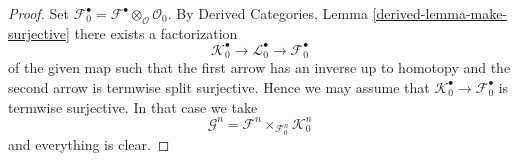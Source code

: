 \documentclass[10pt,a4paper]{amsart}
\theoremstyle{plain}
\theoremstyle{definition}
\theoremstyle{remark}
\numberwithin{equation}{subsection}
\begin{document}
\begin{proof}
Set $\mathcal{F}_0^\bullet =
\mathcal{F}^\bullet \otimes_\mathcal{O} \mathcal{O}_0$.
By Derived Categories, Lemma \ref{derived-lemma-make-surjective}
there exists a factorization
$$
\mathcal{K}_0^\bullet \to \mathcal{L}_0^\bullet \to \mathcal{F}_0^\bullet
$$
of the given map such that the first arrow has an inverse up
to homotopy and the second arrow is termwise split surjective.
Hence we may assume that $\mathcal{K}_0^\bullet \to \mathcal{F}_0^\bullet$
is termwise surjective.
In that case we take
$$
\mathcal{G}^n = \mathcal{F}^n \times_{\mathcal{F}^n_0} \mathcal{K}_0^n
$$
and everything is clear.
\end{proof}
\end{document}
